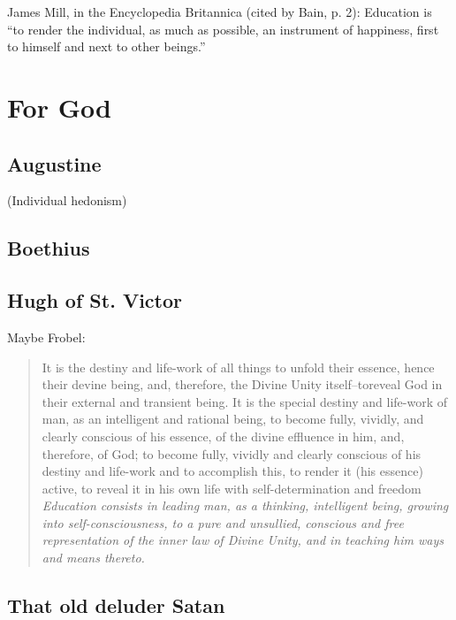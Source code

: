 James Mill, in the Encyclopedia Britannica (cited by Bain, p. 2): Education is ``to render the individual, as much as possible, an instrument of happiness, first to himself and next to other beings.'' ~\citep[p. 2]{Bain:1877tw}

\chapter{For God}
\label{forgod}

\section{Augustine}
\label{augustine}

(Individual hedonism)

\section{Boethius}
\label{boethius}

\section{Hugh of St. Victor}
\label{hughofst.victor}

Maybe Frobel: 

\begin{quote}

It is the destiny and life-work of all things to unfold their essence, hence their devine being, and, therefore, the Divine Unity itself--toreveal God in their external and transient being. It is the special destiny and life-work of man, as an intelligent and rational being, to become fully, vividly, and clearly conscious of his essence, of the divine effluence in him, and, therefore, of God; to become fully, vividly and clearly conscious of his destiny and life-work and to accomplish this, to render it (his essence) active, to reveal it in his own life with self-determination and freedom
\emph{Education consists in leading man, as a thinking, intelligent being, growing into self-consciousness, to a pure and unsullied, conscious and free representation of the inner law of Divine Unity, and in teaching him ways and means thereto.} ~\citep[p. 2]{Frobel:1887vh}
\end{quote}

\section{That old deluder Satan}
\label{thatolddeludersatan}

